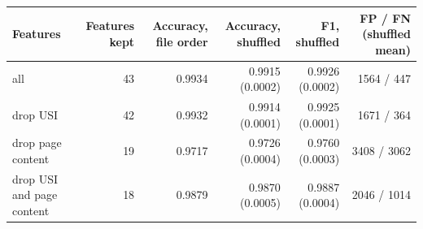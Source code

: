 {\footnotesize
\begin{tabular}{lrrrrr}
\toprule
\textbf{Features} & \textbf{Features kept} & \textbf{Accuracy, file order} & \textbf{Accuracy, shuffled} & \textbf{F1, shuffled} & \textbf{FP / FN (shuffled mean)} \\
\midrule
all & 43 & 0.9934 & 0.9915 (0.0002) & 0.9926 (0.0002) & 1564 / 447 \\
drop USI & 42 & 0.9932 & 0.9914 (0.0001) & 0.9925 (0.0001) & 1671 / 364 \\
drop page content & 19 & 0.9717 & 0.9726 (0.0004) & 0.9760 (0.0003) & 3408 / 3062 \\
drop USI and page content & 18 & 0.9879 & 0.9870 (0.0005) & 0.9887 (0.0004) & 2046 / 1014 \\
\bottomrule
\end{tabular}
}
